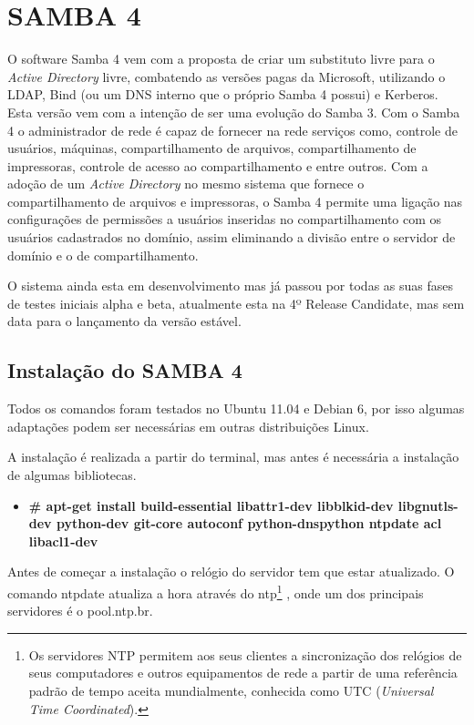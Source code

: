 \chapter{SAMBA 4}

O software Samba 4 vem com a proposta de criar um substituto livre para o \textit{Active Directory} livre, combatendo as versões pagas da Microsoft, utilizando o LDAP, Bind (ou um DNS interno que o próprio Samba 4 possui) e Kerberos. Esta versão vem com a intenção de ser uma evolução do Samba 3. Com o Samba 4 o administrador de rede é capaz de fornecer na rede serviços como, controle de usuários, máquinas, compartilhamento de arquivos, compartilhamento de impressoras, controle de acesso ao compartilhamento e entre outros.
Com a adoção de um \textit{Active Directory} no mesmo sistema que fornece o compartilhamento de arquivos e impressoras, o Samba 4 permite uma ligação nas configurações de permissões a usuários inseridas no compartilhamento com os usuários cadastrados no domínio, assim eliminando a divisão entre o servidor de domínio e o de compartilhamento.

O sistema ainda esta em desenvolvimento mas já passou por todas as suas fases de testes iniciais alpha e beta, atualmente esta na 4º Release Candidate, mas sem data para o lançamento da versão estável.

\section{Instalação do SAMBA 4}

Todos os comandos foram testados no Ubuntu 11.04 e Debian 6, por isso algumas adaptações podem ser necessárias em outras distribuições Linux.

A instalação é realizada a partir do terminal, mas antes é necessária a instalação de algumas bibliotecas.

\begin{itemize}
	\item \textbf{\# apt-get install build-essential libattr1-dev libblkid-dev libgnutls-dev python-dev git-core autoconf python-dnspython ntpdate acl libacl1-dev}
\end{itemize}

Antes de começar a instalação o relógio do servidor tem que estar atualizado. O comando ntpdate atualiza a hora através do  ntp\footnote[2]{Os servidores NTP permitem aos seus clientes a sincronização dos relógios de seus computadores e outros equipamentos de rede a partir de uma referência padrão de tempo aceita mundialmente, conhecida como UTC (\textit{Universal Time Coordinated}).\cite{RNP}} , onde um dos principais servidores é o pool.ntp.br.

